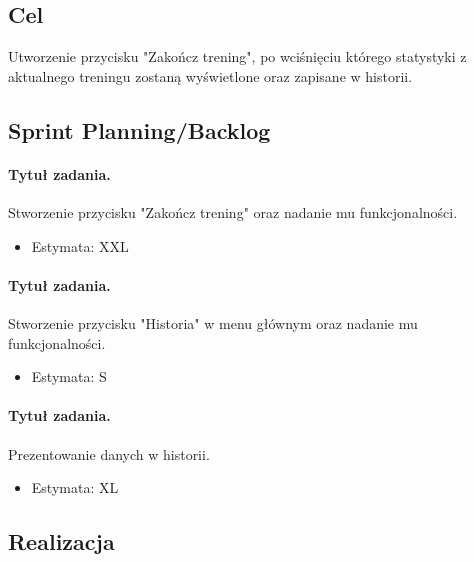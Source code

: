 \documentclass[a4paper]{article}
\begin{document}
\subsection{Cel} Utworzenie przycisku "Zakończ trening", po wciśnięciu którego statystyki z aktualnego treningu zostaną wyświetlone oraz zapisane w historii.

\subsection{Sprint Planning/Backlog}

\paragraph{Tytuł zadania.} Stworzenie przycisku "Zakończ trening" oraz nadanie mu funkcjonalności.
\begin{itemize}
\item Estymata: XXL
\end{itemize}

\paragraph{Tytuł zadania.} Stworzenie przycisku "Historia" w menu głównym oraz nadanie mu funkcjonalności.
\begin{itemize}
\item Estymata: S
\end{itemize}

\paragraph{Tytuł zadania.} Prezentowanie danych w historii.
\begin{itemize}
\item Estymata: XL
\end{itemize}

\subsection{Realizacja}
\end{document}
